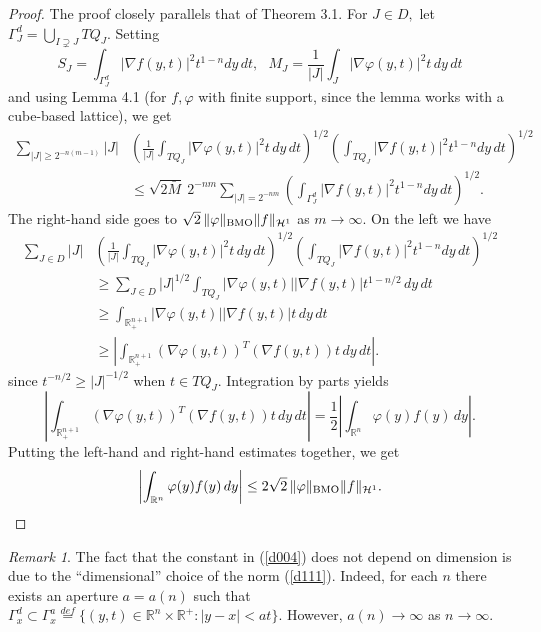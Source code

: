 \documentclass[psamsfonts]{conm-p-l}
\theoremstyle{definition}
\theoremstyle{remark}
\newtheorem{remark}[theorem]{Remark}
\numberwithin{equation}{section}
\begin{document}
\begin{proof}
The proof closely parallels that of Theorem 3.1. For $J\in D,$ let $\Gamma^d_J=\bigcup_{I\supsetneq J}TQ_J.$ Setting
$$
S_J=\int_{\Gamma^d_J}|\nabla f(y,t)|^2t^{1-n}dy\,dt,~~~M_J=\frac1{|J|}\int_J|\nabla\varphi(y,t)|^2t\,dy\,dt
$$
and using Lemma 4.1 (for $f,\varphi$ with finite support, since the lemma works with a cube-based lattice), we get
\begin{align*}
\sum_{|J|\ge 2^{-n(m-1)}}|J|&\left(\frac1{|J|}\int_{TQ_J}|\nabla\varphi(y,t)|^2t\,dy\,dt\right)^{1/2}
\left(\int_{TQ_J}|\nabla f(y,t)|^2t^{1-n}dy\,dt\right)^{1/2}\\
&\le\sqrt{2\bar{M}}~2^{-nm}\sum_{|J|=2^{{-nm}}}\left(\int_{\Gamma^d_J}|\nabla f(y,t)|^2t^{1-n}dy\,dt\right)^{1/2}.
\end{align*}
The right-hand side goes to $\sqrt2\,\|\varphi\|_{{\rm{BMO}}}\|f\|_{\mathcal{H}^1}$ as $m\to\infty.$ On the left we have
\begin{align*}
\sum_{J\in D}|J|&\left(\frac1{|J|}\int_{TQ_J}|\nabla\varphi(y,t)|^2t\,dy\,dt\right)^{1/2}
\left(\int_{TQ_J}|\nabla f(y,t)|^2t^{1-n}dy\,dt\right)^{1/2}\\
&\ge\sum_{J\in D}|J|^{1/2}\int_{TQ_J}|\nabla\varphi(y,t)||\nabla f(y,t)|t^{1-n/2}\,dy\,dt\\
&\ge\int_{\mathbb{R}^{n+1}_+}|\nabla\varphi(y,t)||\nabla f(y,t)|t\,dy\,dt\\
&\ge|\int_{\mathbb{R}^{n+1}_+}(\nabla\varphi(y,t))^T(\nabla f(y,t))t\,dy\,dt|.
\end{align*}
since $t^{-n/2}\ge |J|^{-1/2}$ when $t\in TQ_J.$ Integration by parts yields
$$
\left|\int_{\mathbb{R}^{n+1}_+}(\nabla\varphi(y,t))^T(\nabla f(y,t))t\,dy\,dt\right|=
\frac12\left|\int_{\mathbb{R}^n}\varphi(y)f(y)\,dy\right|.
$$ 
Putting the left-hand and right-hand estimates together, we get
{\begin{equation}\label{d004}{
\left|\int_{\mathbb{R}^n}\varphi(y)f(y)\,dy\right|\le2\sqrt2\,\|\varphi\|_{{\rm{BMO}}}\|f\|_{\mathcal{H}^1}.
}\end{equation}}
\end{proof}
\begin{remark}
The fact that the constant in (\ref{d004}) does not depend on dimension is due to the ``dimensional'' choice of the norm (\ref{d111}). Indeed, for each $n$ there exists an aperture $a=a(n)$ such that $\Gamma_x^d\subset\Gamma_x^a\stackrel{def}{=}\{(y,t)\in\mathbb{R}^n\times\mathbb{R}^+:|y-x|<at\}.$ However, $a(n)\to\infty$ as $n\to\infty.$
\end{remark}
\end{document}
